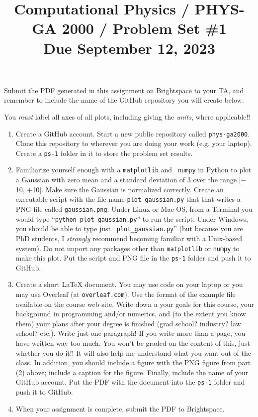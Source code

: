 \documentclass[11pt, preprint]{aastex}
\begin{document}
\title{\bf Computational Physics / PHYS-GA 2000 / Problem Set \#1
\\ Due September 12, 2023 }

Submit the PDF generated in this assignment on Brightspace to your TA,
and remember to include the name of the GitHub repository you will
create below.

You {\it must} label all axes of all plots, including giving the {\it
  units}, where applicable!!

\begin{enumerate}

  \item Create a GitHub account. Start a new public repository called
    {\tt phys-ga2000}. Clone this repository to wherever you are doing
    your work (e.g. your laptop). Create a {\tt ps-1} folder in it to
    store the problem set results.

  \item Familiarize yourself enough with a {\tt matplotlib} and {\tt
    numpy} in Python to plot a Gaussian with zero mean and a standard
    deviation of 3 over the range [$-$10, $+$10]. Make sure the
    Gaussian is normalized correctly. Create an executable script with
    the file name {\tt plot\_gaussian.py} that that writes a PNG file
    called {\tt gaussian.png}. Under Linux or Mac OS, from a Terminal
    you would type ``{\tt python plot\_gaussian.py}'' to run the
    script. Under Windows, you should be able to type just {\tt
      plot\_gaussian.py}'' (but because you are PhD students, I {\it
      strongly} recommend becoming familiar with a Unix-based
    system). Do not import any packages other than {\tt matplotlib} or
    {\tt numpy} to make this plot. Put the script and PNG file in the
    {\tt ps-1} folder and push it to GitHub.

  \item Create a short LaTeX document. You may use code on your laptop
    or you may use Overleaf (at {\tt overleaf.com}). Use the format of
    the example file available on the course web site. Write down a
    your goals for this course, your background in programming and/or
    numerics, and (to the extent you know them) your plans after your
    degree is finished (grad school? industry?  law school?
    etc.). Write just one paragraph! If you write more than a page,
    you have written way too much. You won't be graded on the content
    of this, just whether you do it!! It will also help me understand
    what you want out of the class. In addition, you should include a
    figure with the PNG figure from part (2) above; include a caption
    for the figure. Finally, include the name of your GitHub
    account. Put the PDF with the document into the {\tt ps-1} folder
    and push it to GitHub.

  \item When your assignment is complete, submit the PDF to
    Brightspace.

\end{enumerate}
\end{document}
